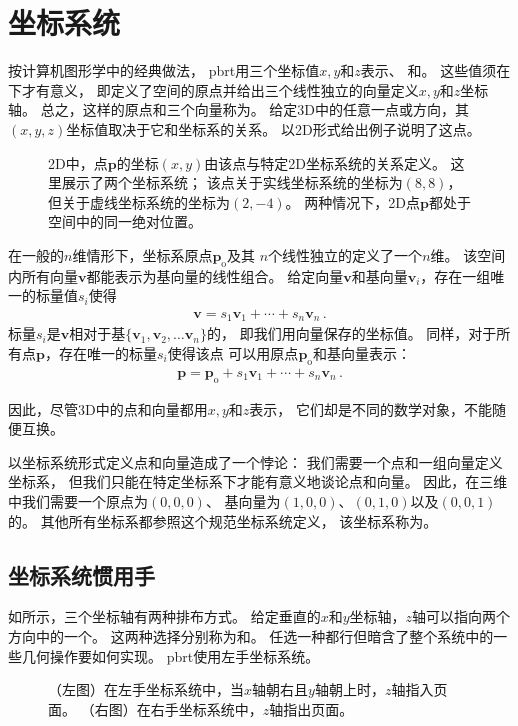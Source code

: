 \section{坐标系统}\label{sec:坐标系统}

按计算机图形学中的经典做法，
pbrt用三个坐标值$x,y$和$z$表示、
和。
这些值须在下才有意义，
即定义了空间的原点并给出三个线性独立的向量定义$x,y$和$z$坐标轴。
总之，这样的原点和三个向量称为。
给定3D中的任意一点或方向，其$(x,y,z)$坐标值取决于它和坐标系的关系。
以2D形式给出例子说明了这点。
\begin{figure}[htbp]
    \centering
    \caption{2D中，点$\bm p$的坐标$(x,y)$由该点与特定2D坐标系统的关系定义。
        这里展示了两个坐标系统；
        该点关于实线坐标系统的坐标为$(8,8)$，但关于虚线坐标系统的坐标为$(2,-4)$。
        两种情况下，2D点$\bm p$都处于空间中的同一绝对位置。}
    \label{fig:2.1}
\end{figure}

在一般的$n$维情形下，坐标系原点$\bm p_\mathrm{o}$及其
$n$个线性独立的定义了一个$n$维。
该空间内所有向量$\bm v$都能表示为基向量的线性组合。
给定向量$\bm v$和基向量$\bm v_i$，存在一组唯一的标量值$s_i$使得
\begin{align*}
    \bm v=s_1\bm v_1+\cdots+s_n\bm v_n\, .
\end{align*}
标量$s_i$是$\bm v$相对于基$\{\bm v_1,\bm v_2,\ldots \bm v_n\}$的，
即我们用向量保存的坐标值。
同样，对于所有点$\bm p$，存在唯一的标量$s_i$使得该点
可以用原点$\bm p_\mathrm{o}$和基向量表示：
\begin{align*}
    \bm p=\bm p_\mathrm{o}+s_1\bm v_1+\cdots+s_n\bm v_n\, .
\end{align*}

因此，尽管3D中的点和向量都用$x,y$和$z$表示，
它们却是不同的数学对象，不能随便互换。

以坐标系统形式定义点和向量造成了一个悖论：
我们需要一个点和一组向量定义坐标系，
但我们只能在特定坐标系下才能有意义地谈论点和向量。
因此，在三维中我们需要一个原点为$(0,0,0)$、
基向量为$(1,0,0)$、$(0,1,0)$以及$(0,0,1)$
的。
其他所有坐标系都参照这个规范坐标系统定义，
该坐标系称为。

\subsection{坐标系统惯用手}\label{sub:坐标系统惯用手}
如所示，三个坐标轴有两种排布方式。
给定垂直的$x$和$y$坐标轴，$z$轴可以指向两个方向中的一个。
这两种选择分别称为和。
任选一种都行但暗含了整个系统中的一些几何操作要如何实现。
pbrt使用左手坐标系统。
\begin{figure}
    \centering
    \caption{（左图）在左手坐标系统中，当$x$轴朝右且$y$轴朝上时，$z$轴指入页面。
        （右图）在右手坐标系统中，$z$轴指出页面。}
    \label{fig:2.2}
\end{figure}